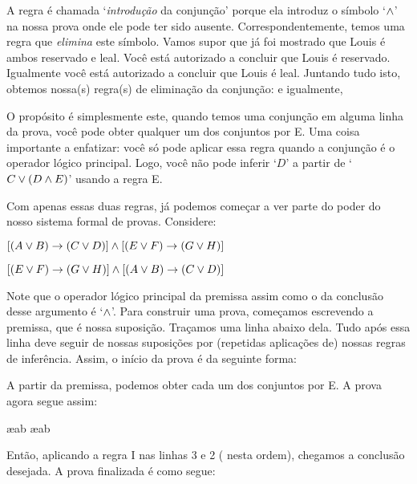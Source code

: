 A regra \'e chamada `\emph{introdu\c c\~ao} da conjun\c c\~ao'  porque  ela introduz  o s\'imbolo `$\wedge$' na nossa  prova onde ele pode ter sido ausente.  Correspondentemente,  temos uma regra que \emph{elimina}  este  s\'imbolo.  Vamos supor que já foi mostrado que Louis \'e ambos  reservado e  leal.  Voc\^e   est\'a autorizado a concluir que Louis   \'e reservado. Igualmente voc\^e   est\'a autorizado a concluir que Louis   \'e leal.  Juntando tudo isto, obtemos nossa(s) regra(s) de elimina\c c\~ao da conjun\c c\~ao:
e igualmente, 

 
O prop\'osito \'e simplesmente este,  quando temos uma conjun\c c\~ao em alguma linha da prova, voc\^e pode obter qualquer um dos conjuntos  por {\eand}E.  Uma coisa importante a enfatizar:  voc\^e s\'o pode aplicar essa regra quando a conjun\c c\~ao \'e o operador l\'ogico principal. Logo, voc\^e n\~ao pode inferir `$D$' a partir de `$C \vee (D \wedge E)$' usando a regra {\eand}E.

Com apenas essas duas regras, j\'a podemos come\c car a ver parte do poder do nosso sistema formal de provas.  Considere: 
\begin{earg}
\item[] $[(A\vee B)\rightarrow(C\vee D)] \wedge [(E \vee F) \rightarrow (G\vee H)]$
\item[\therefore] $[(E \vee F) \rightarrow (G\vee H)] \wedge [(A\vee B)\rightarrow(C\vee D)]$
\end{earg}
Note que o operador l\'ogico principal da premissa assim como o da conclus\~ao  desse argumento \'e `$\wedge$'.  Para construir uma prova, come\c camos escrevendo a premissa, que \'e nossa suposi\c c\~ao. Tra\c camos uma linha abaixo dela. Tudo ap\'os essa linha deve seguir de nossas suposi\c c\~oes por  (repetidas aplica\c c\~oes de) nossas regras de infer\^encia. Assim, o in\'icio da prova \'e da seguinte forma: 
\begin{fitchproof}
\end{fitchproof}
A partir da premissa, podemos obter cada um dos conjuntos por  {\eand}E. A prova agora segue assim: 
\begin{fitchproof}
	 \ae{ab}
	 \ae{ab}
\end{fitchproof}
Ent\~ao, aplicando a regra {\eand}I  nas linhas 3 e 2 ( nesta ordem), chegamos a conclus\~ao desejada. A  prova finalizada \'e como segue:


